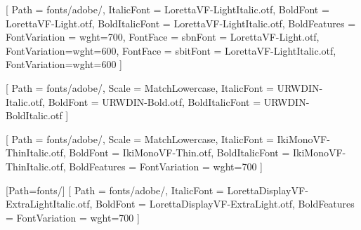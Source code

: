 \usepackage{fontspec}

\setmainfont{LorettaVF-Light.otf}[
    Path           = fonts/adobe/,
    ItalicFont     = LorettaVF-LightItalic.otf,
    BoldFont       = LorettaVF-Light.otf,
    BoldItalicFont = LorettaVF-LightItalic.otf,
    BoldFeatures   = {FontVariation = {wght=700}},
    FontFace       = {sb}{n}{Font = LorettaVF-Light.otf, FontVariation={wght=600}},
    FontFace       = {sb}{it}{Font = LorettaVF-LightItalic.otf, FontVariation={wght=600}}
]

\setsansfont{URWDIN-Regular.otf}[
    Path           = fonts/adobe/,
    Scale          = MatchLowercase,
    ItalicFont     = URWDIN-Italic.otf,
    BoldFont       = URWDIN-Bold.otf,
    BoldItalicFont = URWDIN-BoldItalic.otf
]

\setmonofont{IkiMonoVF-Thin.otf}[
    Path           = fonts/adobe/,
    Scale          = MatchLowercase,
    ItalicFont     = IkiMonoVF-ThinItalic.otf,
    BoldFont       = IkiMonoVF-Thin.otf,
    BoldItalicFont = IkiMonoVF-ThinItalic.otf,
    BoldFeatures   = {FontVariation = {wght=700}}
]

\newfontfamily{}[Path=fonts/]
\newfontfamily{}[
    Path         = fonts/adobe/,
    ItalicFont   = LorettaDisplayVF-ExtraLightItalic.otf,
    BoldFont     = LorettaDisplayVF-ExtraLight.otf,
    BoldFeatures = {FontVariation = {wght=700}}
]

\newcommand{\dinfont}{\sffamily}